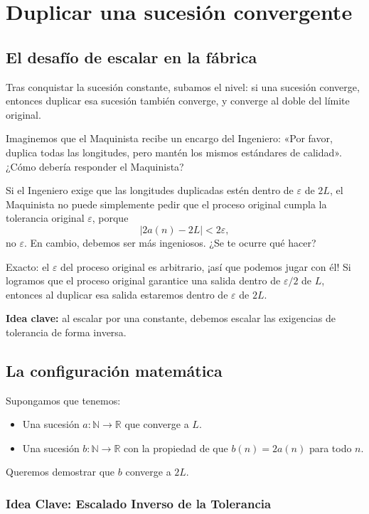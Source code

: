 \chapter{Duplicar una sucesión convergente}

\section{El desafío de escalar en la fábrica}

Tras conquistar la sucesión constante, subamos el nivel: si una sucesión
converge, entonces duplicar esa sucesión también converge, y converge al doble
del límite original.

Imaginemos que el Maquinista recibe un encargo del Ingeniero: «Por favor,
duplica todas las longitudes, pero mantén los mismos estándares de calidad».
¿Cómo debería responder el Maquinista?

Si el Ingeniero exige que las longitudes duplicadas estén dentro de $\varepsilon$
de $2L$, el Maquinista no puede simplemente pedir que el proceso original
cumpla la tolerancia original $\varepsilon$, porque
\[
  |2a(n) - 2L| < 2\varepsilon,
\]
no $\varepsilon$. En cambio, debemos ser más ingeniosos. ¿Se te ocurre qué hacer?

Exacto: el $\varepsilon$ del proceso original es arbitrario, ¡así que podemos
jugar con él! Si logramos que el proceso original garantice una salida dentro
de $\varepsilon/2$ de $L$, entonces al duplicar esa salida estaremos dentro de
$\varepsilon$ de $2L$.

\medskip
\noindent\textbf{Idea clave:} al escalar por una constante, debemos escalar
las exigencias de tolerancia de forma inversa.

\section{La configuración matemática}

Supongamos que tenemos:
\begin{itemize}
  \item Una sucesión $a : \mathbb{N} \to \mathbb{R}$ que converge a $L$.
  \item Una sucesión $b : \mathbb{N} \to \mathbb{R}$ con la propiedad de que
        $b(n) = 2a(n)$ para todo $n$.
\end{itemize}
Queremos demostrar que $b$ converge a $2L$.

\subsection{Idea Clave: Escalado Inverso de la Tolerancia}

